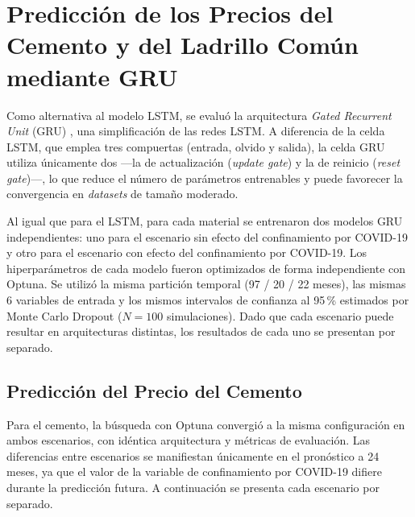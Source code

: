 \section{Predicción de los Precios del Cemento y del Ladrillo Común mediante GRU}
\vspace{0.3cm}

\justify
Como alternativa al modelo LSTM, se evaluó la arquitectura \textit{Gated Recurrent Unit} (GRU) \cite{cho2014learning}, una simplificación de las redes LSTM. A diferencia de la celda LSTM, que emplea tres compuertas (entrada, olvido y salida), la celda GRU utiliza únicamente dos ---la de actualización (\textit{update gate}) y la de reinicio (\textit{reset gate})---, lo que reduce el número de parámetros entrenables y puede favorecer la convergencia en \textit{datasets} de tamaño moderado.

\justify
Al igual que para el LSTM, para cada material se entrenaron dos modelos GRU independientes: uno para el escenario sin efecto del confinamiento por COVID-19 y otro para el escenario con efecto del confinamiento por COVID-19. Los hiperparámetros de cada modelo fueron optimizados de forma independiente con Optuna. Se utilizó la misma partición temporal (97 / 20 / 22 meses), las mismas 6 variables de entrada y los mismos intervalos de confianza al 95\,\% estimados por Monte Carlo Dropout ($N=100$ simulaciones). Dado que cada escenario puede resultar en arquitecturas distintas, los resultados de cada uno se presentan por separado.

\subsection{Predicción del Precio del Cemento}

\justify
Para el cemento, la búsqueda con Optuna convergió a la misma configuración en ambos escenarios, con idéntica arquitectura y métricas de evaluación. Las diferencias entre escenarios se manifiestan únicamente en el pronóstico a 24 meses, ya que el valor de la variable de confinamiento por COVID-19 difiere durante la predicción futura. A continuación se presenta cada escenario por separado.

